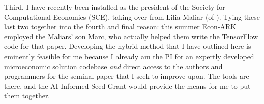 \documentclass[11pt,pdftex,letterpaper]{article}
\begin{document}
\nocite{HARK}

Third, I have recently been installed as the president of the Society for Computational Economics (SCE), taking over from Lilia Maliar (of \cite{MALIAR202176}). Tying these last two together into the fourth and final reason: this summer Econ-ARK employed the Maliars' son Marc, who actually helped them write the TensorFlow code for that paper. Developing the hybrid method that I have outlined here is eminently feasible for me because I already am the PI for an expertly developed microeconomic solution codebase \textit{and} direct access to the authors and programmers for the seminal paper that I seek to improve upon. The tools are there, and the AI-Informed Seed Grant would provide the means for me to put them together.

\newpage

\begin{singlespace}
    
	
\end{singlespace}
\end{document}
